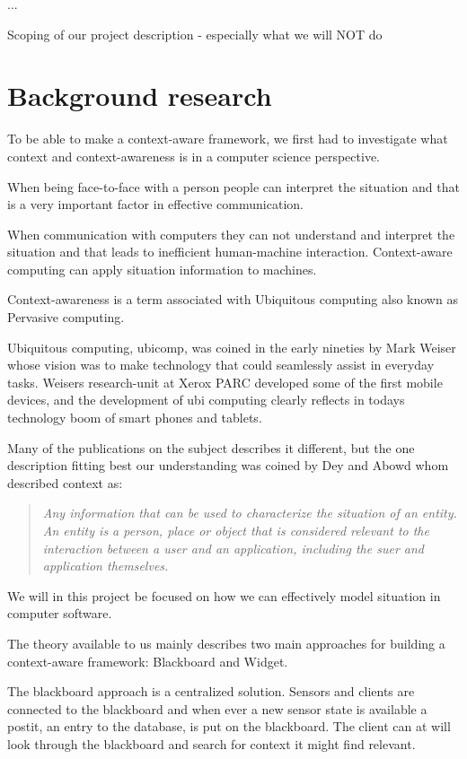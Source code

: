 \documentclass[]{report}
\begin{document}
...

Scoping of our project description - especially what we will NOT do



\chapter{Background research}


To be able to make a context-aware framework, we first had to investigate what context and context-awareness is in a computer science perspective.


When being face-to-face with a person people can interpret the situation and that is a very important factor in effective communication. 

When communication with computers they can not understand and interpret the situation and that leads to inefficient human-machine interaction. Context-aware computing can apply situation information to machines.

Context-awareness is a term associated with Ubiquitous computing also known as Pervasive computing.

Ubiquitous computing, ubicomp, was coined in the early nineties by Mark Weiser whose vision was to make technology that could seamlessly assist in everyday tasks. Weisers research-unit at Xerox PARC developed some of the first mobile devices, and the development of ubi computing clearly reflects in todays technology boom of smart phones and tablets.

Many of the publications on the subject describes it different, but the one description fitting best our understanding was coined by Dey and Abowd whom described context as:


\blockquote{
	\textit{Any information that can be used to characterize the situation of an entity. An entity is a person, place or object that is considered relevant to the interaction between a user and an application, including the suer and application themselves.} \cite{Dey and Abowd (2000)} 
}

We will in this project be focused on how we can effectively model situation in computer software.

The theory available to us mainly describes two main approaches for building a context-aware framework: Blackboard and Widget.


The blackboard approach is a centralized solution. Sensors and clients are connected to the blackboard and when ever a new sensor state is available a postit, an entry to the database, is put on the blackboard. The client can at will look through the blackboard and search for context it might find relevant.
\end{document}
